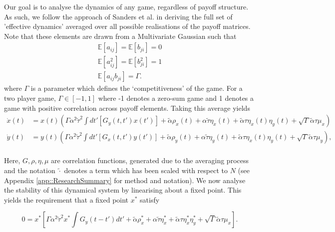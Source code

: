\documentclass[.../main.tex]{subfiles}
\begin{document}
    Our goal is to analyse the dynamics of any game, regardless of
    payoff structure. As such, we follow the approach of Sanders et
    al. in deriving the full set of 'effective dynamics' averaged over
    all possible realisations of the payoff matrices. Note that these
    elements are drawn from a Multivariate Gaussian such that
    \begin{equation*}
        \begin{split}
            \mathbb{E}[a_{ij}] = \mathbb{E}[b_{ji}] = 0\\
            \mathbb{E}[a_{ij}^2] = \mathbb{E}[b_{ji}^2] = 1\\
            \mathbb{E}[a_{ij} b_{ji}] = \Gamma.
        \end{split}
    \end{equation*}
    where $\Gamma$ is a parameter which defines the `competitiveness' of the game. For a two player
    game, $\Gamma \in [-1, 1]$ where -1 denotes a zero-sum game and 1 denotes a game with positive
    correlation across payoff elements. Taking this average  yields
%
    \begin{equation}
    \begin{split}
        \dot{x}(t) &= x(t)(\Gamma \alpha^2 \tilde{\tau}^2 \int dt'[G_y(t, t')x(t')] + 
        \tilde{\alpha}
        \rho_x(t) + \alpha \tilde{\tau} \eta_x(t) + \tilde{\alpha} \tau \eta_x(t) \eta_y(t) +
        \sqrt{\Gamma} \tilde{\alpha} \tau \mu_x) \\
        \dot{y}(t) &= y(t)(\Gamma \alpha^2 \tilde{\tau}^2 \int dt'[G_x(t, t')y(t')] + 
        \tilde{\alpha} \rho_y(t) +
        \alpha \tilde{\tau} \eta_y(t) + \tilde{\alpha} \tau \eta_x(t) \eta_y(t)+ 
        \sqrt{\Gamma} \tilde{\alpha} \tau \mu_y), \\
    \end{split}
    \end{equation}

    Here, $G, \rho, \eta, \mu$ are correlation functions, generated due to the averaging process 
    and the notation $\tilde{\cdot}$ denotes a term which has been scaled with respect to $N$ (see
    Appendix \ref{app::ResearchSummary} for method and notation). We now analyse the stability of
    this dynamical system by linearising about a fixed point. This yields the requirement that a
    fixed point $x^*$ satisfy

    \begin{equation}
    0 = x^* \left[\Gamma \alpha^2 \tilde{\tau}^2 x^* \int G_y(t - t') dt' + \tilde{\alpha} \rho_x^* + \alpha \tilde{\tau} \eta_x^* + \tilde{\alpha} \tau \eta_x^* \eta_y^* + \sqrt{\Gamma} \tilde{\alpha} \tau \mu_x \right].
    \end{equation}
\end{document}
